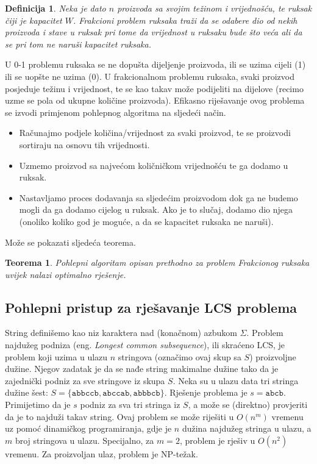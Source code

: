 \documentclass[a4paper, utf8, 11pt, colorlinks]{book}
\newtheorem{definition}{Definicija}
\newtheorem{thm}{Teorema}
\begin{document}
\begin{definition}
  Neka je dato $n$ proizvoda sa svojim  težinom i vrijednošću, 
  te ruksak čiji je kapacitet $W$. Frakcioni problem ruksaka traži da se   odabere dio od nekih proizvoda i stave u ruksak pri tome da vrijednost u ruksaku bude što veća ali da se pri tom ne naruši kapacitet ruksaka.
\end{definition}
U 0-1 problemu ruksaka se ne dopušta dijeljenje proizvoda, ili se uzima cijeli (1) ili se uopšte ne uzima (0). U frakcionalnom problemu ruksaka, svaki proizvod posjeduje težinu i vrijednost, te se kao takav može podijeliti na dijelove (recimo uzme se pola od ukupne količine proizvoda). Efikasno riješavanje ovog problema se izvodi primjenom pohlepnog algoritma na sljedeći način. 
\begin{itemize}
	\item Računajmo podjele količina/vrijednost za svaki proizvod, te se proizvodi  sortiraju na osnovu tih vrijednosti.   \item Uzmemo proizvod sa najvećom količničkom vrijednošću te ga dodamo u ruksak. 
	\item Nastavljamo proces dodavanja sa sljedećim proizvodom dok ga ne budemo mogli da ga  dodamo cijelog u ruksak.    Ako je to slučaj, dodamo dio njega (onoliko koliko god je moguće, a da se kapacitet ruksaka ne naruši). 
\end{itemize}
Može se pokazati sljedeća teorema. 

\begin{thm}
      Pohlepni algoritam opisan prethodno za problem Frakcionog ruksaka uvijek nalazi optimalno rješenje.
\end{thm}
\subsection{Pohlepni pristup za rješavanje LCS problema}

String definišemo kao niz karaktera nad (konačnom) azbukom $\Sigma$. 
Problem najdužeg podniza (eng. \emph{Longest common subsequence}), ili skraćeno LCS, je problem koji uzima u ulazu  $n$ stringova (označimo ovaj skup sa $S$) proizvoljne dužine. Njegov zadatak je da se nađe string makimalne dužine tako da je  zajednički podniz za sve stringove iz skupa $S$.  Neka su u ulazu data tri stringa dužine šest: $S = \{  \texttt{abbccb}, \texttt{abccab}, \texttt{abbbcb}   \}$. Rješenje problema je $s=\texttt{abcb}$. Primijetimo da je $s$ podniz za sva tri stringa iz $S$, a može se (direktno) provjeriti da je to najduži takav string. 
 Ovaj problem se može riješiti u $O(n^m)$ vremenu uz pomoć dinamičkog programiranja, gdje je $n$ dužina najdužeg stringa u ulazu, a $m$ broj stringova u ulazu. Specijalno, za  $m=2$, problem je rješiv u $O(n^2)$ vremenu. Za proizvoljan ulaz, problem je NP-težak.  
\end{document}
